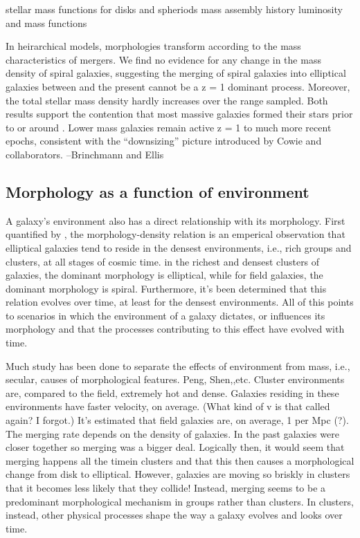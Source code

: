 stellar mass functions for disks and spheriods \citep{Thanjavur2016,Bell2003}
mass assembly history \citep{Bundy2005, Taylor2015, Brinchmann2000}
luminosity and mass functions \citep{Blanton2003b, Blanton2001}


In heirarchical models, morphologies transform according to the mass characteristics of mergers. We find no evidence for any change in the mass density of
spiral galaxies, suggesting the merging of spiral galaxies into
elliptical galaxies between and the present cannot be a z = 1
dominant process. Moreover, the total stellar mass density
hardly increases over the range sampled. Both results support
the contention that most massive galaxies formed their stars
prior to or around . Lower mass galaxies remain active z = 1
to much more recent epochs, consistent with the “downsizing”
picture introduced by Cowie and collaborators. --Brinchmann and Ellis


\subsection{Morphology as a function of environment}
A galaxy's environment also has a direct relationship with its morphology. First quantified by \cite{Dressler1980}, the morphology-density relation is an emperical observation that elliptical galaxies tend to reside in the densest environments, i.e., rich groups and clusters, at all stages of cosmic time. in the richest and densest clusters of galaxies, the dominant morphology is elliptical, while for field galaxies, the dominant morphology is spiral. Furthermore, it's been determined that this relation evolves over time, at least for the densest environments. All of this points to scenarios in which the environment of a galaxy dictates, or influences its morphology and that the processes contributing to this effect have evolved with time. \citep[e.g.,][]{Fasano2000, Shen2003, Smith2005, Peng2010}

Much study has been done to separate the effects of environment from mass, i.e., secular, causes of morphological features. Peng, Shen,,etc. Cluster environments are, compared to the field, extremely hot and dense. Galaxies residing in these environments have faster velocity, on average. (What kind of v is that called again? I forgot.)  It's estimated that field galaxies are, on average, 1 per Mpc (?). The merging rate depends on the density of galaxies. In the past galaxies were closer together so merging was a bigger deal. Logically then, it would seem that merging happens all the timein clusters and that this then causes a morphological change from disk to elliptical. However, galaxies are moving so briskly in clusters that it becomes less likely that they collide! Instead, merging seems to be a predominant morphological mechanism in groups rather than clusters. In clusters, instead, other physical processes shape the way a galaxy evolves and looks over time. 

